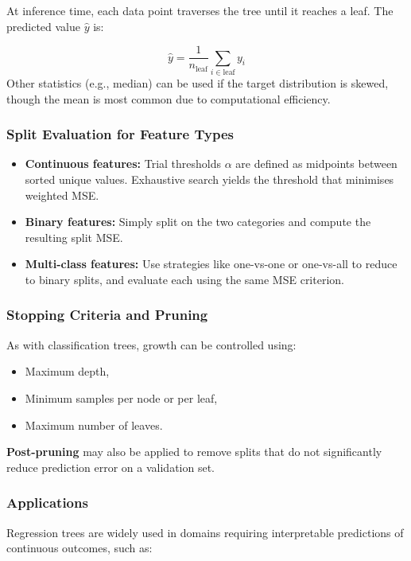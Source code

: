 \documentclass[9pt]{extarticle}
\begin{document}
At inference time, each data point traverses the tree until it reaches a leaf. The predicted value $\hat{y}$ is:

\[
\hat{y} = \frac{1}{n_{\text{leaf}}} \sum_{i \in \text{leaf}} y_i
\]
Other statistics (e.g., median) can be used if the target distribution is skewed, though the mean is most common due to computational efficiency.

\subsubsection*{Split Evaluation for Feature Types}

\begin{itemize}
    \item \textbf{Continuous features:} Trial thresholds $\alpha$ are defined as midpoints between sorted unique values. Exhaustive search yields the threshold that minimises weighted MSE.
    \item \textbf{Binary features:} Simply split on the two categories and compute the resulting split MSE.
    \item \textbf{Multi-class features:} Use strategies like one-vs-one or one-vs-all to reduce to binary splits, and evaluate each using the same MSE criterion.
\end{itemize}

\subsubsection*{Stopping Criteria and Pruning}

As with classification trees, growth can be controlled using:

\begin{itemize}
    \item Maximum depth,
    \item Minimum samples per node or per leaf,
    \item Maximum number of leaves.
\end{itemize}
\textbf{Post-pruning} may also be applied to remove splits that do not significantly reduce prediction error on a validation set.

\subsubsection*{Applications}

Regression trees are widely used in domains requiring interpretable predictions of continuous outcomes, such as:
\end{document}
